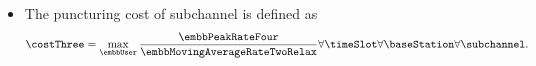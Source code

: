 \begin{frame}
  \begin{itemize}
    \item The puncturing cost of subchannel is defined as
      \begin{equation}
        \costThree = \max_{\embbUser}{\frac{\embbPeakRateFour}{\embbMovingAverageRateTwoRelax}} \forall\timeSlot \forall\baseStation \forall\subchannel.
      \end{equation}
  \end{itemize}
\end{frame}
